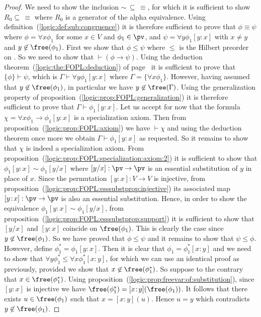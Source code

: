 \begin{proof}
We need to show the inclusion $\sim\,\subseteq\,\equiv$, for which
it is sufficient to show $R_{0}\subseteq\,\equiv$ where $R_{0}$ is a
generator of the alpha equivalence. Using
definition~(\ref{logic:def:sub:congruence}) it is therefore
sufficient to prove that $\phi\equiv\psi$ where $\phi=\forall
x\phi_{1}$ for some $x\in V$ and $\phi_{1}\in\pv$, and $\psi=\forall
y\phi_{1}[y\!:\!x]$ with $x\neq y$ and $y\not\in\free(\phi_{1})$.
First we show that $\phi\leq\psi$ where $\leq$ is the Hilbert
preorder on \pv. So we need to show that $\vdash(\phi\to\psi)$.
Using the deduction theorem~(\ref{logic:the:FOPL:deduction}) of
page~\pageref{logic:the:FOPL:deduction} it is sufficient to prove
that $\{\phi\}\vdash\psi$, which is $\Gamma\vdash\forall
y\phi_{1}[y\!:\!x]$ where $\Gamma=\{\forall x\phi_{1}\}$. However,
having assumed that $y\not\in\free(\phi_{1})$, in particular we have
$y\not\in\free(\Gamma)$. Using the generalization property of
proposition~(\ref{logic:prop:FOPL:generalization}) it is therefore
sufficient to prove that $\Gamma\vdash\phi_{1}[y\!:\!x]$. Let us
accept for now that the formula $\chi=\forall
x\phi_{1}\to\phi_{1}[y\!:\!x]$ is a specialization axiom. Then from
proposition~(\ref{logic:prop:FOPL:axiom}) we have $\vdash\chi$ and
using the deduction theorem once more we obtain
$\Gamma\vdash\phi_{1}[y\!:\!x]$ as requested. So it remains to show
that $\chi$ is indeed a specialization axiom. From
proposition~(\ref{logic:prop:FOPL:specialization:axiom:2}) it is
sufficient to show that $\phi_{1}[y\!:\!x]\sim\phi_{1}[y/x]$ where
$[y/x]:\pv\to\pv$ is an essential substitution of $y$ in place of
$x$. Since the permutation $[y\!:\!x]:V\to V$ is injective, from
proposition~(\ref{logic:prop:FOPL:esssubstprop:injective}) its
associated map $[y\!:\!x]:\pv\to\pv$ is also an essential
substitution. Hence, in order to show the equivalence
$\phi_{1}[y\!:\!x]\sim\phi_{1}[y/x]$, from
proposition~(\ref{logic:prop:FOPL:esssubstprop:support}) it is
sufficient to show that $[y/x]$ and $[y\!:\!x]$ coincide on
$\free(\phi_{1})$. This is clearly the case since
$y\not\in\free(\phi_{1})$. So we have proved that $\phi\leq\psi$ and
it remains to show that $\psi\leq\phi$. However, define
$\phi_{1}^{*}=\phi_{1}[y\!:\!x]$. Then it is clear that
$\phi_{1}=\phi_{1}^{*}[x\!:\!y]$ and we need to show that $\forall
y\phi_{1}^{*}\leq\forall x \phi_{1}^{*}[x\!:\!y]$, for which we can
use an identical proof as previously, provided we show that
$x\not\in\free(\phi_{1}^{*})$. So suppose to the contrary that
$x\in\free(\phi_{1}^{*})$. Using
proposition~(\ref{logic:prop:freevar:of:substitution}), since
$[y\!:\!x]$ is injective we have
$\free(\phi_{1}^{*})=[x\!:\!y](\free(\phi_{1}))$. It follows that
there exists $u\in\free(\phi_{1})$ such that $x=[x\!:\!y](u)$. Hence
$u=y$ which contradicts $y\not\in\free(\phi_{1})$.
\end{proof}

